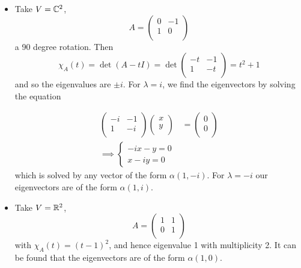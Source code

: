 \documentclass{../template/note}
\begin{document}
    \begin{example}
        \begin{itemize}
            \item Take \(V = \mathbb C^2\),
            \[
                A = \begin{pmatrix}
                 0 & -1 \\
                 1 & 0 \\
                \end{pmatrix}
            \]
            a 90 degree rotation. Then
            \[
                \chi_A(t) = \det(A - tI) = \det\begin{pmatrix}
                 -t & -1 \\
                 1 & -t \\
                \end{pmatrix} = t^2+1
            \]
            and so the eigenvalues are \(\pm i\). For \(\lambda = i\), we find the eigenvectors by solving the equation
            
            \begin{align*}
                \begin{pmatrix}
                 -i & -1 \\
                 1 & -i \\
                \end{pmatrix} \begin{pmatrix}
                 x \\
                 y \\
                \end{pmatrix} &= \begin{pmatrix}
                 0 \\
                 0 \\
                \end{pmatrix} \\
                \implies \begin{cases}
                    -ix - y = 0 \\
                    x - iy = 0
                \end{cases}    
            \end{align*}
            which is solved by any vector of the form \(\alpha(1, -i)\). For \(\lambda = -i\) our eigenvectors are of the form \(\alpha(1, i)\).
            \item Take \(V = \mathbb R^2\),
            \[
                A = \begin{pmatrix}
                 1 & 1 \\
                 0 & 1 \\
                \end{pmatrix}
            \]
            with \(\chi_A(t) = (t-1)^2\), and hence eigenvalue 1 with multiplicity 2. It can be found that the eigenvectors are of the form \(\alpha(1, 0)\).
        \end{itemize}
    \end{example}
    
\end{document}
